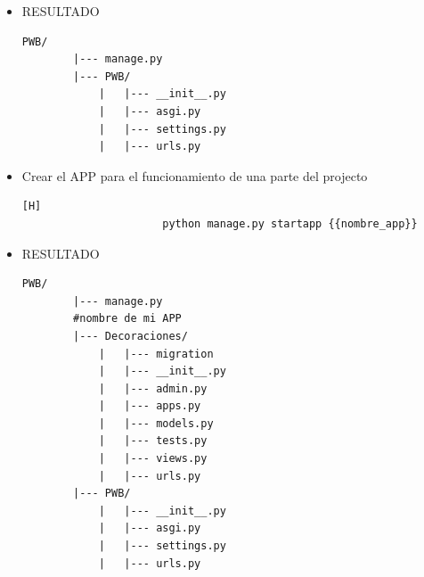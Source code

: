 \documentclass{article}
\begin{document}
\begin{itemize}
        \begin{lstlisting}[language=bash,caption={Entorno de Linux-Ejecute el script de activación para activar el entorno virtual:}][H]
    		          django-admin startproject {{nombre_del_proyecto}}
    	\end{lstlisting}
        \item RESULTADO
        \begin{lstlisting}[style=ascii-tree]
        PWB/
        |--- manage.py
        |--- PWB/
            |   |--- __init__.py
            |   |--- asgi.py
            |   |--- settings.py
            |   |--- urls.py
        \end{lstlisting}
        \item Crear el APP para el funcionamiento de una parte del projecto
        \begin{lstlisting}[language=bash,caption={Entorno de Linux-Ejecute el script de activación para activar el entorno virtual:}][H]
    		          python manage.py startapp {{nombre_app}}
    	\end{lstlisting}
        \item RESULTADO
        \begin{lstlisting}[style=ascii-tree]
        PWB/
        |--- manage.py
        #nombre de mi APP
        |--- Decoraciones/
            |   |--- migration
            |   |--- __init__.py
            |   |--- admin.py
            |   |--- apps.py
            |   |--- models.py
            |   |--- tests.py
            |   |--- views.py
            |   |--- urls.py
        |--- PWB/
            |   |--- __init__.py
            |   |--- asgi.py
            |   |--- settings.py
            |   |--- urls.py
        \end{lstlisting}
    \end{itemize}
\end{document}

